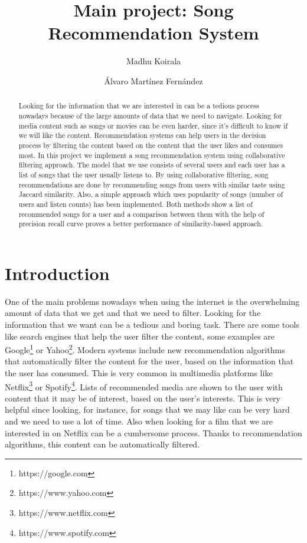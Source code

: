 \documentclass{jot}
\title{Main project: Song Recommendation System}
\author[affiliation=UiT, nowrap]
    {Madhu Koirala}
    {is a master student in Computer Science at the University of Troms\o. You can contact him at \email{mko075@uit.no}.}
\author[affiliation=UiT, nowrap]
    {\'{A}lvaro Mart\'{i}nez Fern\'{a}ndez}
    { is a master student in Computer Science at the University of Troms\o. You can contact him at \email{afe026@uit.no}.}
\affiliation{UiT}{University of Troms\o, Norway\\
\url{https://uit.no/startsida}}
\begin{document}
\begin{abstract}
Looking for the information that we are interested in can be a tedious process nowadays because of the large amounts of data that we need to navigate. Looking for media content such as songs or movies can be even harder, since it’s difficult to know if we will like the content. Recommendation systems can help users in the decision process by filtering the content based on the content that the user likes and consumes most. In this project we implement a song recommendation system using collaborative filtering approach. The model that we use consists of several users and each user has a list of songs that the user usually listens to. By using collaborative filtering, song recommendations are done by recommending songs from users with similar taste using Jaccard similarity. Also, a simple approach which uses popularity of songs (number of users and listen counts) has been implemented. Both methods show a list of recommended songs for a user and a comparison between them with the help of precision recall curve proves a better performance of similarity-based approach.
\end{abstract}


\tableofcontents

\section{Introduction}
One of the main problems nowadays when using the internet is the overwhelming amount of data that we get and that we need to filter. Looking for the information that we want can be a tedious and boring task. There are some tools like search engines that help the user filter the content, some examples are Google\footnote{https://google.com} or Yahoo\footnote{https://www.yahoo.com}. Modern systems include new recommendation algorithms that automatically filter the content for the user, based on the information that the user has consumed. This is very common in multimedia platforms like Netflix\footnote{https://www.netflix.com} or Spotify\footnote{https://www.spotify.com}. Lists of recommended media are shown to the user with content that it may be of interest, based on the user’s interests. This is very helpful since looking, for instance, for songs that we may like can be very hard and we need to use a lot of time. Also when looking for a film that we are interested in on Netflix can be a cumbersome process. Thanks to recommendation algorithms, this content can be automatically filtered.
\end{document}
